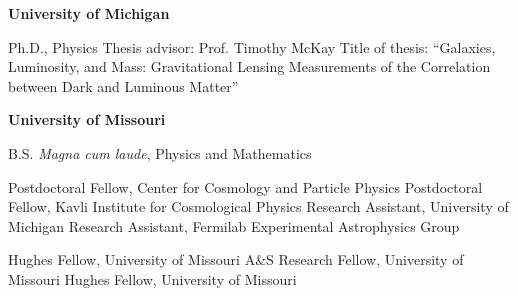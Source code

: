 \documentclass[12pt]{article}
\begin{document}
\ssp
\ssp
\noindent
{}
{\bf University of Michigan}
\hfill
{}
\normalsize

\tsp
\noindent
\makebox[1.25in][l]{}
\parbox{5.40in}{
Ph.D., Physics\newline
Thesis advisor: Prof. Timothy McKay\newline
Title of thesis: ``Galaxies, Luminosity, and Mass: Gravitational Lensing Measurements of the Correlation between Dark and Luminous Matter''
}

\isp
\noindent
\makebox[1.25in][l]{}
{\bf University of Missouri}
\hfill
{}
\normalsize

\tsp
\noindent
\makebox[1.25in][l]{}
\parbox{5.40in}{B.S. {\it Magna cum laude}, Physics and Mathematics}

%
%

\ssp
\ssp
\noindent
{}
	{Postdoctoral Fellow, Center for Cosmology and Particle Physics}
        \newline
{}
        \hfill
\newline
\makebox[1.25in][l]{}
	{Postdoctoral Fellow, Kavli Institute for Cosmological Physics}
	\newline
{}
	\hfill
\newline
\makebox[1.25in][l]{}
	{{Research Assistant, University of Michigan}}
	\hfill
\newline
\makebox[1.25in][l]{}
	{Research Assistant, Fermilab Experimental Astrophysics Group}

	\hfill
\newline
\makebox[1.25in][l]{}
	{Hughes Fellow, University of Missouri}
	\hfill
\newline
\makebox[1.25in][l]{}
	{A\&S Research Fellow, University of Missouri}
	\hfill
\newline
\makebox[1.25in][l]{}
	{Hughes Fellow, University of Missouri}
	\hfill
\end{document}
